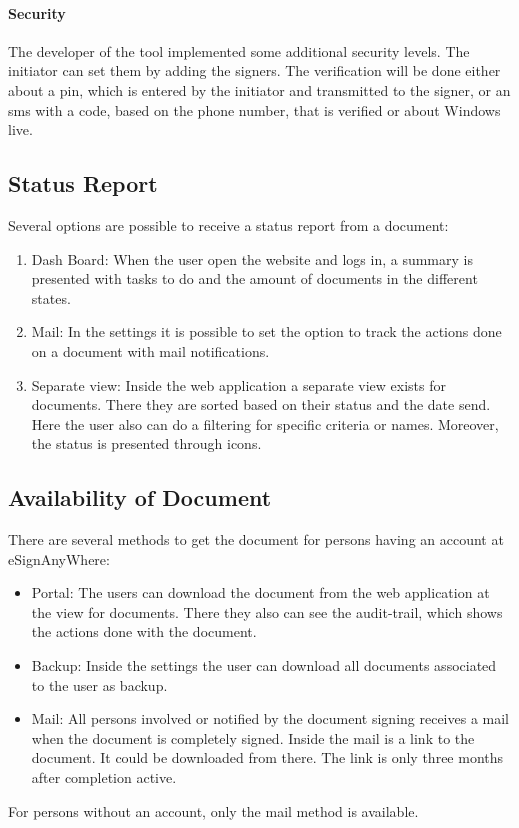 \paragraph{Security}
The developer of the tool implemented some additional security levels. The initiator can set them by adding the signers. The verification will be done either about a pin, which is entered by the initiator and transmitted to the signer, or an \gls{sms} with a code, based on the phone number, that is verified or about Windows live.

\subsection{Status Report}
Several options are possible to receive a status report from a document:
\begin{enumerate}
	\item Dash Board: When the user open the website and logs in, a summary is presented with tasks to do and the amount of documents in the different states.
	\item Mail: In the settings it is possible to set the option to track the actions done on a document with mail notifications.
	\item Separate view: Inside the web application a separate view exists for documents. There they are sorted based on their status and the date send. Here the user also can do a filtering for specific criteria or names. Moreover, the status is presented through icons.
\end{enumerate}

\subsection{Availability of Document}
There are several methods to get the document for persons having an account at eSignAnyWhere:
\begin{itemize}
	\item Portal: The users can download the document from the web application at the view for documents. There they also can see the audit-trail, which shows the actions done with the document.
	\item Backup: Inside the settings the user can download all documents associated to the user as backup.
	\item Mail: All persons involved or notified by the document signing receives a mail when the document is completely signed. Inside the mail is a link to the document. It could be downloaded from there. The link is only three months after completion active.  
\end{itemize}
For persons without an account, only the mail method is available.

